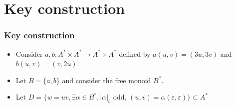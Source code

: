 \documentclass{beamer}
\theoremstyle{definition}
\begin{document}
%
%
%
%


\section{Key construction}

\begin{frame}
\frametitle{Key construction}
\begin{itemize}
\item<1-> Consider $a,b:A^*\times A^*\to A^*\times A^*$ defined by $a(u,v)=(3u,3v)$ and $b(u,v)=(v,2u)$. 
\item<2-> Let $B=\{a,b\}$ and consider the free monoid $B^*$.
\item<3-> Let $D=\{w=uv, \exists\alpha\in B^*, |\alpha|_b$ odd, $(u,v)=\alpha(\varepsilon,\varepsilon)\}\subset A^*$
\end{itemize}


\end{frame}
\end{document}
